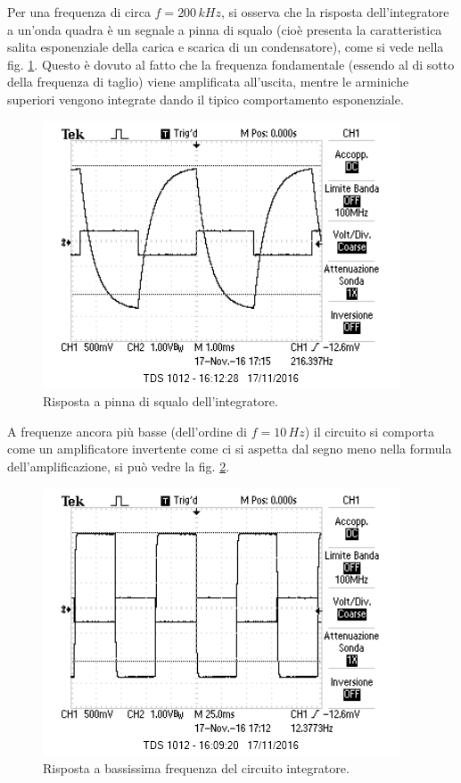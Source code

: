 \documentclass[10pt,a4paper]{article}
\begin{document}
Per una frequenza di circa $f = 200 \, kHz$, si osserva che la risposta dell'integratore a un'onda quadra è un segnale a pinna di squalo (cioè presenta la caratteristica salita esponenziale della carica e scarica di un condensatore), come si vede nella fig. \ref{squalo}. Questo è dovuto al fatto che la frequenza fondamentale (essendo al di sotto della frequenza di taglio) viene amplificata all'uscita, mentre le arminiche superiori vengono integrate dando il tipico comportamento esponenziale.

\begin{figure}[!htb]
\centering
  \includegraphics[scale=1.0]{immagini/pinnasqualo.png}
\caption{Risposta a pinna di squalo dell'integratore.}
\label{squalo}
\end{figure}

A frequenze ancora più basse (dell'ordine di $f = 10 \,Hz$) il circuito si comporta come un amplificatore invertente come ci si aspetta dal segno meno nella formula dell'amplificazione, si può vedre la fig. \ref{bassafreq}.
\begin{figure}[!htb]
\centering
  \includegraphics[scale=1.0]{immagini/bassafreqondaquadra.png}
\caption{Risposta a bassissima frequenza del circuito integratore.}
\label{bassafreq}
\end{figure}
\end{document}
